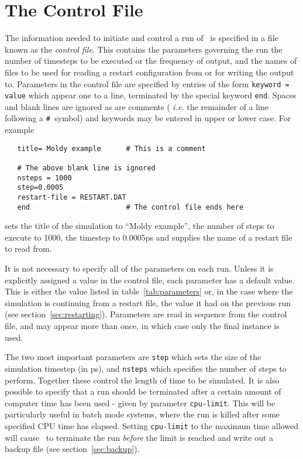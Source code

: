 \section{The Control File}
\label{sec:control}

The information needed to initiate and control a run of \moldy\  is
specified in a file known as the {\em control file}. This contains the
parameters governing the run \eg the number of timesteps to be
executed or the frequency of output, and the names of files to be used
\eg for reading a restart configuration from or for writing the
output to. Parameters in the control file are specified by entries of the form
\verb'keyword = value'
which appear one to a line, terminated by the special keyword
\verb'end'.  Spaces and blank lines are ignored as are comments ({\em
i.e.} the remainder of a line following a \verb'#'~symbol) and
keywords may be entered in upper or lower case. For example
\begin{verbatim}
   title= Moldy example      # This is a comment

   # The above blank line is ignored
   nsteps = 1000
   step=0.0005
   restart-file = RESTART.DAT
   end                       # The control file ends here
\end{verbatim}
sets the title of the simulation to ``Moldy example'', the number of
steps to execute to 1000, the timestep to 0.0005ps and supplies the
name of a restart file to read from.

It is not necessary to specify all of the parameters on each run.
Unless it is explicitly assigned a value in the control file, each
parameter has a default value.  This is either the value listed in
table~\ref{tab:parameters} or, in the case where the simulation is
continuing from a restart file, the value it had on the previous run
(see section~\ref{sec:restarting}). Parameters are read in sequence
from the control file, and may appear more than once, in which case
only the final instance is used.  

The two most important parameters are \verb'step' which sets the size
of the simulation timestep (in ps), and \verb'nsteps' which specifies
the number of steps to perform.  Together these control the length of
time to be simulated.  It is also possible to specify that a run
should be terminated after a certain amount of computer time has been
used - given by parameter \verb'cpu-limit'.  This will be particularly
useful in batch mode systems, where the run is killed after some
specified CPU time has elapsed.  Setting \verb'cpu-limit' to the
maximum time allowed will cause \moldy\  to terminate the run {\em
before} the limit is reached and write out a backup file (see
section~\ref{sec:backup}).

